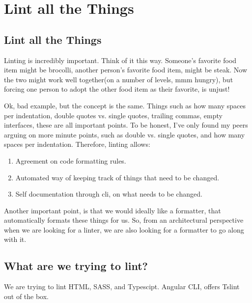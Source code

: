\maketitle{}
\section{ Lint all the Things }

\subsection{ Lint all the Things }

Linting is incredibly important. Think of it this way. Someone's favorite food
item might be brocolli, another person's favorite food item, might be steak.
Now the two might work well together(on a number of levels, mmm hungry), but
forcing one person to adopt the other food item as their favorite, is unjust!

Ok, bad example, but the concept is the same. Things such as how many spaces per
indentation, double quotes vs. single quotes, trailing commas, empty interfaces,
these are all important points. To be honest, I've only found my peers arguing
on more minute points, such as double vs. single quotes, and how many spaces
per indentation. Therefore, linting allows:
\begin{enumerate}
  \item Agreement on code formatting rules.
  \item Automated way of keeping track of things that need to be changed.
  \item Self documentation through cli, on what needs to be changed.
\end{enumerate}

Another important point, is that we would ideally like a formatter, that
automatically formats these things for us. So, from an architectural perspective
when we are looking for a linter, we are also looking for a formatter to go along
with it.

\subsection{ What are we trying to lint? }
We are trying to lint HTML, SASS, and Typescipt. Angular CLI, offers Tslint out
of the box. 
